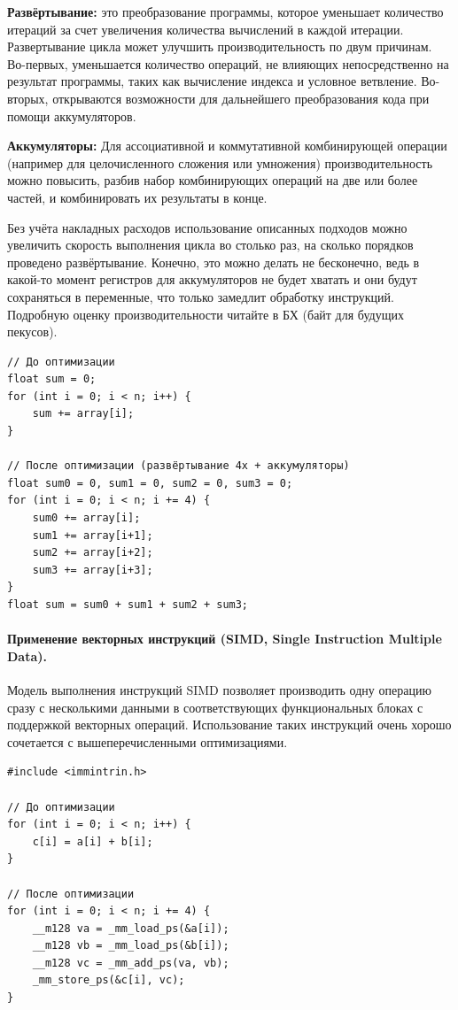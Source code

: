 \documentclass[12pt,a4paper]{article}
\begin{document}
\textbf{Развёртывание: } это преобразование программы, которое уменьшает количество итераций за счет увеличения количества вычислений в каж­дой итерации. Развертывание цикла может улучшить производительность по двум причинам. Во-первых, уменьшается количество операций, не влияющих непосредственно на результат программы, таких как вычисление индекса и условное ветвление. Во-вторых, открываются возможности для дальнейшего преобразования кода при помощи аккумуляторов.

\textbf{Аккумуляторы: } Для ассоциативной и коммутативной комбинирующей операции (например для целочисленного сложения или умножения) производительность можно повысить, разбив набор комбинирующих операций на две или более частей, и комбинировать их результаты в конце. 

Без учёта накладных расходов использование описанных подходов можно увеличить скорость выполнения цикла во столько раз, на сколько порядков проведено развёртывание. Конечно, это можно делать не бесконечно, ведь в какой-то момент регистров для аккумуляторов не будет хватать и они будут сохраняться в переменные, что только замедлит обработку инструкций. Подробную оценку производительности читайте в БХ (байт для будущих пекусов).

\begin{verbatim}
// До оптимизации
float sum = 0;
for (int i = 0; i < n; i++) {
    sum += array[i];
}

// После оптимизации (развёртывание 4x + аккумуляторы)
float sum0 = 0, sum1 = 0, sum2 = 0, sum3 = 0;
for (int i = 0; i < n; i += 4) {
    sum0 += array[i];
    sum1 += array[i+1];
    sum2 += array[i+2];
    sum3 += array[i+3];
}
float sum = sum0 + sum1 + sum2 + sum3;
\end{verbatim}

\paragraph{Применение векторных инструкций (SIMD, Single Instruction Multiple Data).}

Модель выполнения инструкций SIMD позволяет производить одну операцию сразу с несколькими данными в соответствующих функциональных блоках с поддержкой векторных операций. Использование таких инструкций очень хорошо сочетается с вышеперечисленными оптимизациями.

\begin{verbatim}
#include <immintrin.h>

// До оптимизации
for (int i = 0; i < n; i++) {
    c[i] = a[i] + b[i];
}

// После оптимизации
for (int i = 0; i < n; i += 4) {
    __m128 va = _mm_load_ps(&a[i]);
    __m128 vb = _mm_load_ps(&b[i]);
    __m128 vc = _mm_add_ps(va, vb);
    _mm_store_ps(&c[i], vc);
}
\end{verbatim}
\end{document}
